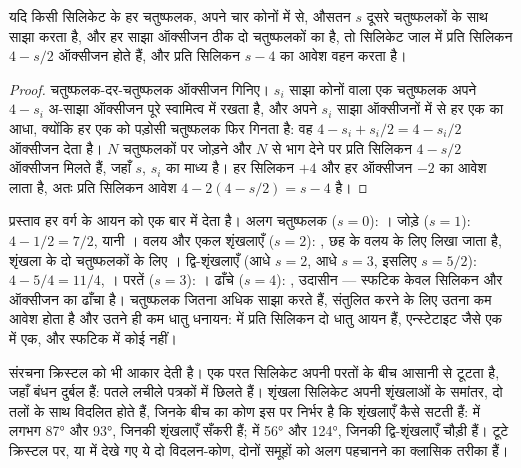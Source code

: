\begin{proposition}[सिलिकन और ऑक्सीजन का अनुपात]\label{prop:b1:rock-forming-minerals:si-o}
यदि किसी सिलिकेट के हर  चतुष्फलक, अपने चार कोनों में से, औसतन $s$ दूसरे चतुष्फलकों के साथ साझा करता
है, और हर साझा ऑक्सीजन ठीक दो चतुष्फलकों का है, तो सिलिकेट जाल में प्रति सिलिकन $4 - s/2$ ऑक्सीजन होते हैं, और
प्रति सिलिकन $s - 4$ का आवेश वहन करता है।
\end{proposition}

\begin{proof}
चतुष्फलक-दर-चतुष्फलक ऑक्सीजन गिनिए। $s_i$ साझा कोनों वाला एक चतुष्फलक अपने $4 - s_i$ अ-साझा ऑक्सीजन पूरे
स्वामित्व में रखता है, और अपने $s_i$ साझा ऑक्सीजनों में से हर एक का आधा, क्योंकि हर एक को पड़ोसी चतुष्फलक
फिर गिनता है: वह $4 - s_i + s_i/2 = 4 - s_i/2$ ऑक्सीजन देता है। $N$ चतुष्फलकों पर जोड़ने और $N$ से भाग देने पर
प्रति सिलिकन $4 - s/2$ ऑक्सीजन मिलते हैं, जहाँ $s$, $s_i$ का माध्य है। हर सिलिकन $+4$ और हर ऑक्सीजन $-2$
का आवेश लाता है, अतः प्रति सिलिकन आवेश $4 - 2(4 - s/2) = s - 4$ है।
\end{proof}

प्रस्ताव हर वर्ग के आयन को एक बार में देता है। अलग चतुष्फलक ($s = 0$): । जोड़े ($s = 1$): $4 - 1/2 = 7/2$,
यानी । वलय और एकल शृंखलाएँ ($s = 2$): , छह के वलय के लिए  लिखा जाता है,
शृंखला के दो चतुष्फलकों के लिए । द्वि-शृंखलाएँ (आधे $s = 2$, आधे $s = 3$, इसलिए $s = 5/2$):
$4 - 5/4 = 11/4$, । परतें ($s = 3$): । ढाँचे ($s = 4$): , उदासीन --- स्फटिक
केवल सिलिकन और ऑक्सीजन का ढाँचा है। चतुष्फलक जितना अधिक साझा करते हैं, संतुलित करने के लिए उतना कम आवेश
होता है और उतने ही कम धातु धनायन:   में प्रति सिलिकन दो धातु आयन हैं, एन्स्टेटाइट जैसे एक 
 में एक, और स्फटिक में कोई नहीं।

संरचना क्रिस्टल को भी आकार देती है। एक परत सिलिकेट अपनी परतों के बीच आसानी से टूटता है, जहाँ बंधन दुर्बल हैं:
 पतले लचीले पत्रकों में छिलते हैं। शृंखला सिलिकेट अपनी शृंखलाओं के समांतर, दो तलों के साथ विदलित होते
हैं, जिनके बीच का कोण इस पर निर्भर है कि शृंखलाएँ कैसे सटती हैं:  में लगभग \ang{87} और \ang{93}, जिनकी
शृंखलाएँ सँकरी हैं;  में \ang{56} और \ang{124}, जिनकी द्वि-शृंखलाएँ चौड़ी हैं। टूटे क्रिस्टल पर, या  में देखे गए ये दो विदलन-कोण, दोनों समूहों को अलग पहचानने का क्लासिक तरीका हैं।

